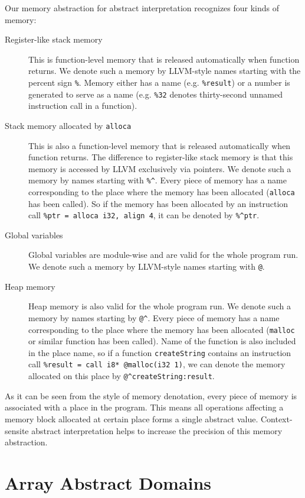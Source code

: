 \documentclass[a4paper]{book}
\begin{document}
Our memory abstraction for abstract interpretation recognizes four
kinds of memory:
\begin{description}
\item[Register-like stack memory] This is function-level memory that
  is released automatically when function returns.  We denote such a
  memory by LLVM-style names starting with the percent sign
  \texttt{\%}.  Memory either has a name (e.g. \texttt{\%result}) or a
  number is generated to serve as a name (e.g. \texttt{\%32} denotes
  thirty-second unnamed instruction call in a function).
\item[Stack memory allocated by \texttt{alloca}] This is also a
  function-level memory that is released automatically when function
  returns.  The difference to register-like stack memory is that this
  memory is accessed by LLVM exclusively via pointers.  We denote such
  a memory by names starting with \texttt{\%\^}.  Every piece of
  memory has a name corresponding to the place where the memory has
  been allocated (\texttt{alloca} has been called).  So if the memory
  has been allocated by an instruction call \texttt{\%ptr = alloca
    i32, align 4}, it can be denoted by \texttt{\%\^{}ptr}.
\item[Global variables] Global variables are module-wise and are valid
  for the whole program run.  We denote such a memory by LLVM-style
  names starting with \texttt{@}.
\item[Heap memory] Heap memory is also valid for the whole program
  run.  We denote such a memory by names starting by \texttt{@\^}.
  Every piece of memory has a name corresponding to the place where
  the memory has been allocated (\texttt{malloc} or similar function
  has been called).  Name of the function is also included in the
  place name, so if a function \texttt{createString} contains an
  instruction call \texttt{\%result = call i8* @malloc(i32 1)}, we can
  denote the memory allocated on this place by
  \texttt{@\^{}createString:result}.
\end{description}

As it can be seen from the style of memory denotation, every piece of
memory is associated with a place in the program.  This means all
operations affecting a memory block allocated at certain place forms a
single abstract value.  Context-sensite abstract interpretation helps
to increase the precision of this memory abstraction.

\chapter{Array Abstract Domains}
\end{document}
